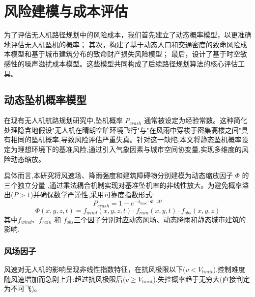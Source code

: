 
\section{风险建模与成本评估}
\label{sec:tpr_models}

为了评估无人机路径规划中的风险成本，我们首先建立了动态概率模型，以更准确地评估无人机坠机的概率；
其次，构建了基于动态人口和交通密度的致命风险成本模型和基于城市建筑分布的致命财产损失风险模型；
最后，设计了基于时空敏感性的噪声滋扰成本模型。这些模型共同构成了后续路径规划算法的核心评估工具。

\subsection{动态坠机概率模型}
\label{subsec:pcrash_model}

在现有无人机航路规划研究中,坠机概率 $P_{crash}$ 通常被设定为经验常数。这种简化处理隐含地假设"无人机在晴朗空旷环境飞行"与"在风雨中穿梭于密集高楼之间"具有相同的坠机概率,导致风险评估严重失真。针对这一缺陷,本文将静态坠机概率设定为理想环境下的基准风险,通过引入气象因素与城市空间协变量,实现多维度的风险动态缩放。

具体而言,本研究将风速场、降雨强度和建筑障碍物分别建模为动态缩放因子 $\Phi$ 的三个独立分量 ,通过乘法耦合机制实现对基准坠机率的非线性放大。为避免概率溢出($P > 1$)并确保数学严谨性,采用可靠度指数形式:
\begin{equation}
P_{crash} = 1 - e^{-\lambda_{base} \cdot \Phi \cdot \Delta t}
\label{eq:pcrash_base}
\end{equation}
\begin{equation}
\Phi(x,y,z,t) = f_{wind}(x,y,z,t) \cdot f_{rain}(x,y,t) \cdot f_{obs}(x,y,z)
\label{eq:phi_composite}
\end{equation}
其中$f_{wind}$、$f_{rain}$ 和 $f_{obs}$三个因子分别对应动态风场、动态降雨和静态城市建筑的影响.

\subsubsection[Wind Field Factor]{风场因子}
\label{subsubsec:f_wind}

风速对无人机的影响呈现非线性指数特征，在抗风极限以下($v < V_{limit}$),控制难度随风速增加而急剧上升;超过抗风极限后($v \geq V_{limit}$),失控概率趋于无穷大(直接判定为不可飞)。

